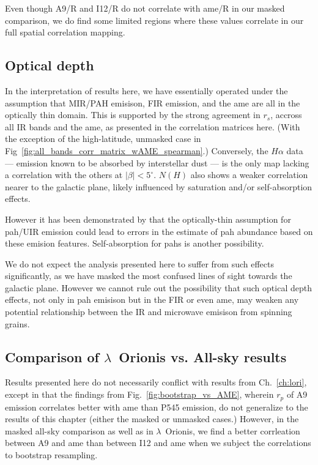              Even though A9/R and I12/R do not correlate with \acrshort{ame}/R in our masked comparison, we do find some limited regions where these values correlate in our full spatial correlation mapping.

            \subsection{Optical depth}
              In the interpretation of results here, we have essentially operated under the assumption that MIR/PAH emisison, FIR emission, and the \acrshort{ame} are all in the optically thin domain. This is supported by the strong agreement in $r_{s}$, accross all IR bands and the \acrshort{ame}, as presented in the correlation matrices here. (With the exception of the high-latitude, unmasked case in Fig~\ref{fig:all_bands_corr_matrix_wAME_spearman}.) Conversely, the $H{\alpha}$ data --- emission known to be absorbed by interstellar dust --- is the only map lacking a correlation with the others at $|\beta{}|<5^{\circ}$. $N(H)$ also shows a weaker correlation nearer to the galactic plane, likely influenced by saturation and/or self-absorption effects.

              However it has been demonstrated by \cite{sakon04} that the optically-thin assumption for \acrshort{pah}/UIR emission could lead to errors in the estimate of \acrshort{pah} abundance based on these emision features. Self-absorption for \acrshort{pah}s is another possibility.

              We do not expect the analysis presented here to suffer from such effects significantly, as we have masked the most confused lines of sight towards the galactic plane. However we cannot rule out the possibility that such optical depth effects, not only in \acrshort{pah} emisison but in the FIR or even \acrshort{ame}, may weaken any potential relationship between the IR and microwave emisison from spinning grains.

            \subsection{Comparison of $\lambda$~Orionis vs. All-sky results}
              Results presented here do not necessarily conflict with results from Ch.~\ref{ch:lori}, except in that the findings from Fig.~\ref{fig:bootstrap_vs_AME}, wherein $r_{p}$ of A9 emission correlates better with \acrshort{ame} than P545 emission, do not generalize to the results of this chapter (either the masked or unmasked cases.) However, in the masked all-sky comparison as well as in $\lambda$~Orionis, we find a better corrleation between A9 and \acrshort{ame} than between I12 and \acrshort{ame} when we subject the correlations to bootstrap resampling.

